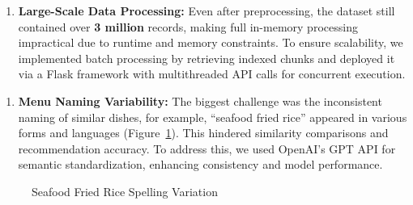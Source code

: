 \documentclass[
  11pt,
  a4paper,
  DIV=11,
  numbers=noendperiod]{scrartcl}
\providecommand{\tightlist}{%
  \setlength{\itemsep}{0pt}\setlength{\parskip}{0pt}}\usepackage{longtable,booktabs,array}
\begin{document}
\begin{enumerate}
\def\labelenumi{\arabic{enumi}.}
\setcounter{enumi}{1}
\tightlist
\item
  \textbf{Large-Scale Data Processing:} Even after preprocessing, the
  dataset still contained over \textbf{3 million} records, making full
  in-memory processing impractical due to runtime and memory
  constraints. To ensure scalability, we implemented batch processing by
  retrieving indexed chunks and deployed it via a Flask framework with
  multithreaded API calls for concurrent execution.
\end{enumerate}

\newpage

\begin{enumerate}
\def\labelenumi{\arabic{enumi}.}
\setcounter{enumi}{2}
\tightlist
\item
  \textbf{Menu Naming Variability:} The biggest challenge was the
  inconsistent naming of similar dishes, for example, ``seafood fried
  rice'' appeared in various forms and languages
  (Figure~\ref{fig-seafood-fried-rice-var}). This hindered similarity
  comparisons and recommendation accuracy. To address this, we used
  OpenAI's GPT API for semantic standardization, enhancing consistency
  and model performance.
\end{enumerate}

\begin{figure}

\caption{\label{fig-seafood-fried-rice-var}Seafood Fried Rice Spelling
Variation}


\end{figure}%
\end{document}
